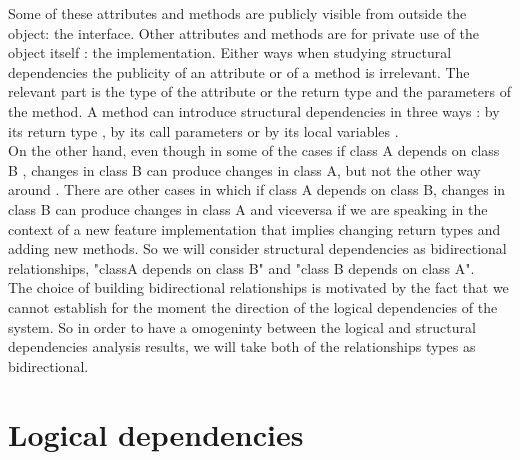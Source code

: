 Some of these attributes and methods are publicly visible from outside the object:  the interface. Other
attributes and methods are for private use of the object itself : the implementation. Either ways when studying structural dependencies the publicity of an attribute or of a method is irrelevant. \cite{oopconcept} The relevant part is the type of the attribute or the return type and the parameters of the method. A method can introduce structural dependencies in three ways : by its return type , by its call parameters or by its local variables .\\

\tab On the other hand, even though in some of the cases if class A depends on class B , changes in class B can produce changes in class A, but not the other way around \cite{ct5} . There are other cases in which if class A depends on class B, changes in class B can produce changes in class A and viceversa if we are speaking in the context of a new feature implementation that implies changing return types and adding new methods. So we will consider structural dependencies as bidirectional relationships, "classA depends on class B" and "class B depends on class A".\\ \tab The choice of building bidirectional relationships is motivated by the fact that we cannot establish for the moment the direction of the logical dependencies of the system. So in order to have a omogeninty between the logical and structural dependencies analysis results, we will take both of the relationships types as bidirectional. 

\section{Logical dependencies}
